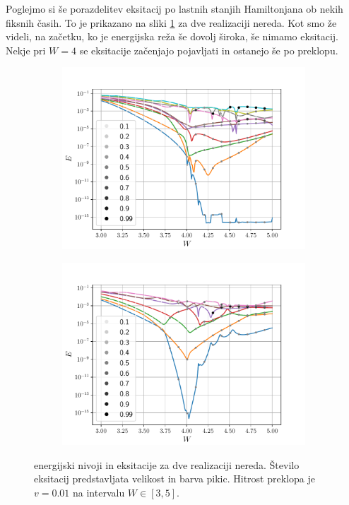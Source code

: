 Poglejmo si še porazdelitev eksitacij po lastnih stanjih Hamiltonjana ob nekih fiksnih časih. To je prikazano na sliki \ref{fig:EksTekom} za dve realizaciji nereda. Kot smo že videli, na začetku, ko je energijska reža še dovolj široka, še nimamo eksitacij. Nekje pri $W=4$ se eksitacije začenjajo pojavljati in ostanejo še po preklopu. 

\begin{figure}[H]
\centering
\begin{subfigure}{.49\textwidth}
\includegraphics[width=\linewidth]{Figures/EksTekom1.pdf}
\end{subfigure}
\begin{subfigure}{.49\textwidth}
\includegraphics[width=\linewidth]{Figures/EksTekom2.pdf}
\end{subfigure}
\caption{energijski nivoji in eksitacije za dve realizaciji nereda. Število eksitacij predstavljata velikost in barva pikic. Hitrost preklopa je $v=0.01$ na intervalu $W \in [3,5]$.}
\label{fig:EksTekom}
\end{figure}
